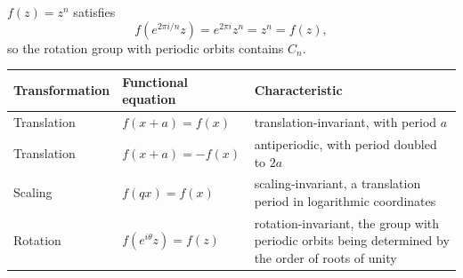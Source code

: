 \begin{example}\label{ex:rotation_symmetric}
$f(z)=z^n$ satisfies
\[
f(e^{2\pi i/n}z)=e^{2\pi i}z^n=z^n=f(z),
\]
so the rotation group with periodic orbits contains $C_n$.
\end{example}

\begin{remark}\label{rem:three_transformations_function_features}
\leavevmode\par
\begin{center}
\begin{tabularx}{\linewidth}{@{}>{\raggedright\arraybackslash}p{3.1cm}
    >{\raggedright\arraybackslash}p{4.0cm}
    >{\raggedright\arraybackslash}X@{}}
\toprule
Transformation & Functional equation & Characteristic \\
\midrule
Translation & $f(x+a)=f(x)$ & translation-invariant, with period $a$ \\
Translation & $f(x+a)=-f(x)$ & antiperiodic, with period doubled to $2a$ \\
Scaling & $f(qx)=f(x)$ & scaling-invariant, a translation period in logarithmic coordinates \\
Rotation & $f(e^{i\theta}z)=f(z)$ & rotation-invariant, the group with periodic orbits being determined by the order of roots of unity \\
\bottomrule
\end{tabularx}
\end{center}
\end{remark}


